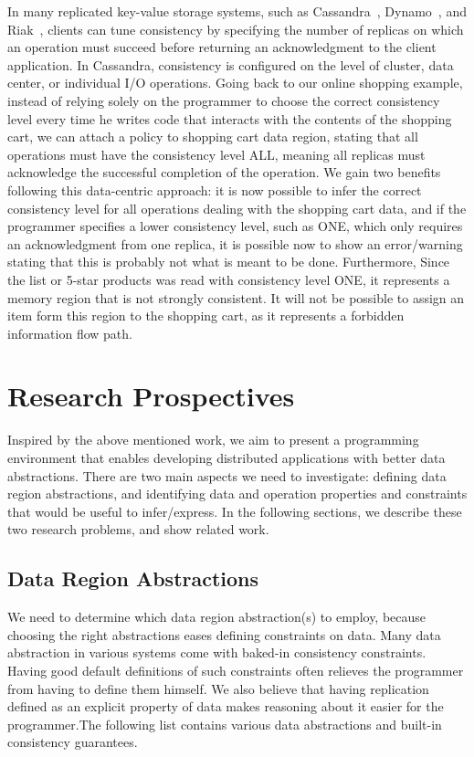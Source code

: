 \documentclass[]{usiinfprospectus}
\begin{document}
In many replicated key-value storage systems, such as Cassandra~\cite{lakshman2010cassandra}, Dynamo~\cite{hastorun2007dynamo}, and Riak~\cite{redmond2012seven}, clients can tune consistency by specifying the number of replicas on which an operation must succeed before returning an acknowledgment to the client application. In Cassandra, consistency is configured on the level of cluster, data center, or individual I/O operations. Going back to our online shopping example, instead of relying solely on the programmer to choose the correct consistency level every time he writes code that interacts with the contents of the shopping cart, we can attach a policy to shopping cart data region, stating that all operations must have the consistency level ALL, meaning all replicas must acknowledge the successful completion of the operation. We gain two benefits following this data-centric approach: it is now possible to infer the correct consistency level for all operations dealing with the shopping cart data, and if the programmer specifies a lower consistency level, such as ONE, which only requires an acknowledgment from one replica, it is possible now to show an error/warning stating that this is probably not what is meant to be done. Furthermore, Since the list or 5-star products was read with consistency level ONE, it represents a memory region that is not strongly consistent. It will not be possible to assign an item form this region to the shopping cart, as it represents a forbidden information flow path. 
\section{Research Prospectives}

Inspired by the above mentioned work, we aim to present a programming environment that enables developing distributed applications with better data abstractions. There are two main aspects we need to investigate: defining data region abstractions, and identifying data and operation properties and constraints that would be useful to infer/express. In the following sections, we describe these two research problems, and show related work.

\subsection{Data Region Abstractions}
We need to determine which data region abstraction(s) to employ, because choosing the right abstractions eases defining constraints on data. Many data abstraction in various systems come with baked-in consistency constraints. Having good default definitions of such constraints often relieves the programmer from having to define them himself. We also believe that having replication defined as an explicit property of data makes reasoning about it easier for the programmer.The following list contains various data abstractions and built-in consistency guarantees. 
\end{document}
